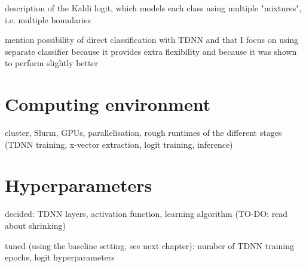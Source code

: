 \documentclass[bsc,frontabs,twoside,singlespacing,parskip,deptreport]{infthesis}
\begin{document}
{{    description of the Kaldi logit, which models each class using multiple "mixtures", i.e. multiple boundaries
    
    mention possibility of direct classification with TDNN and that I focus on using separate classifier because it provides extra flexibility and because it was shown to perform slightly better
  }

  \section{Computing environment}{
    cluster, Slurm, GPUs, parallelisation, rough runtimes of the different stages (TDNN training, x-vector extraction, logit training, inference)
  }

  \section{Hyperparameters}{
    decided: TDNN layers, activation function, learning algorithm (TO-DO: read about shrinking)

    tuned (using the baseline setting, see next chapter): number of TDNN training epochs, logit hyperparameters
  }
}
\end{document}
